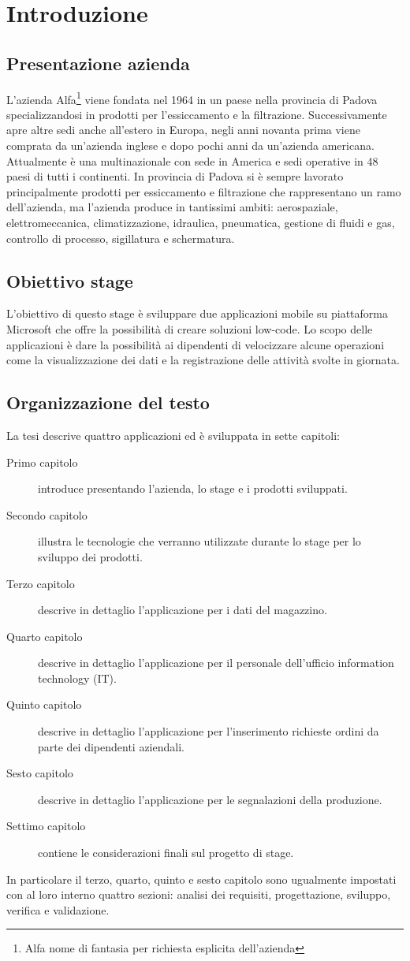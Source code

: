 \chapter{Introduzione}
\section{Presentazione azienda}
L'azienda Alfa\footnote{Alfa nome di fantasia  per richiesta esplicita dell'azienda} viene fondata nel 1964 in un paese nella provincia di Padova specializzandosi in prodotti per l'essiccamento e la filtrazione.
Successivamente apre altre sedi anche all'estero in Europa, negli anni novanta prima viene comprata da un'azienda inglese e dopo pochi anni da un'azienda americana.
Attualmente è una multinazionale con sede in America e sedi operative in 48 paesi di tutti i continenti. 
In provincia di Padova si è sempre lavorato principalmente prodotti per essiccamento e filtrazione che rappresentano un ramo dell’azienda, ma l’azienda produce in tantissimi ambiti: aerospaziale, elettromeccanica, climatizzazione, idraulica, pneumatica, gestione di fluidi e gas, controllo di processo, sigillatura e schermatura.
\section{Obiettivo stage}
L'obiettivo di questo stage è sviluppare due applicazioni mobile su piattaforma Microsoft che offre la possibilità di creare soluzioni low-code.
Lo scopo delle applicazioni è dare la possibilità ai dipendenti di velocizzare alcune operazioni come la visualizzazione dei dati e la registrazione delle attività svolte in giornata.

\newpage
\section{Organizzazione del testo}
La tesi descrive quattro applicazioni ed è sviluppata in sette capitoli:
\begin{description}
  \item[Primo capitolo] introduce presentando l'azienda, lo stage e i prodotti sviluppati.
  \item[Secondo capitolo] illustra le tecnologie che verranno utilizzate durante lo stage per lo sviluppo dei prodotti.
  \item[Terzo capitolo] descrive in dettaglio l'applicazione per i dati del magazzino.
  \item[Quarto capitolo] descrive in dettaglio l'applicazione per il personale dell'ufficio information technology (IT).
  \item[Quinto capitolo] descrive in dettaglio l'applicazione per l'inserimento richieste ordini da parte dei dipendenti aziendali.
  \item[Sesto capitolo] descrive in dettaglio l'applicazione per le segnalazioni della produzione.
  \item[Settimo capitolo] contiene le considerazioni finali sul progetto di stage.    
\end{description}
In particolare il terzo, quarto, quinto e sesto capitolo sono ugualmente impostati con al loro interno quattro sezioni: analisi dei requisiti, progettazione, sviluppo, verifica e validazione.

